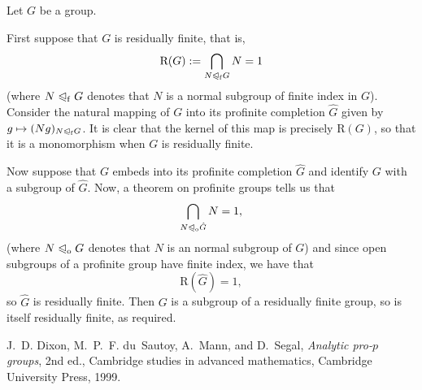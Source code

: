\documentclass[12pt]{article}
\newcommand{\nsgpf}{\trianglelefteqslant_{\mathrm{f}}}
\newcommand{\nsgpo}{\trianglelefteqslant_{\mathrm{o}}}
\begin{document}

Let $G$ be a group.

First suppose that $G$ is residually finite, that is,
\[
        \mathrm{R}(G) := \bigcap_{N \nsgpf G} N = 1
\]
(where $N \nsgpf G$ denotes that $N$ is a normal subgroup of finite index in $G$).
Consider the natural mapping of $G$ into its profinite completion $\hat{G}$
given by $g \mapsto (Ng)_{N \nsgpf G}$.
It is clear that the kernel of this map is precisely $\mathrm{R}(G)$,
so that it is a monomorphism when $G$ is residually finite.

Now suppose that $G$ embeds into its profinite completion $\hat{G}$
and identify $G$ with a subgroup of $\hat{G}$. Now, a theorem on
profinite groups tells us that
\[
        \bigcap_{N \nsgpo \hat{G}} N = 1,
\]
(where $N \nsgpo G$ denotes that $N$ is an  normal subgroup of $G$) and since open subgroups of a profinite group have finite index, we
have that
\[
        \mathrm{R}(\hat{G}) = 1,
\]
so $\hat{G}$ is residually finite. Then $G$ is a subgroup of a
residually finite group, so is itself residually finite, as required.

\begin{thebibliography}{99}

J.~D. Dixon, M.~P.~F. du~Sautoy, A.~Mann, and D.~Segal, \emph{Analytic
 pro-$p$ groups}, 2nd ed., Cambridge studies in advanced mathematics,
 Cambridge University Press, 1999.

\end{thebibliography}
\end{document}
